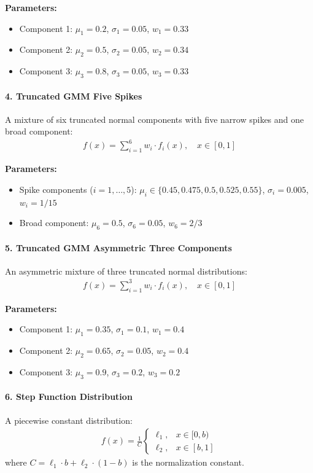 \textbf{Parameters:}
\begin{itemize}
\item Component 1: $\mu_1 = 0.2$, $\sigma_1 = 0.05$, $w_1 = 0.33$
\item Component 2: $\mu_2 = 0.5$, $\sigma_2 = 0.05$, $w_2 = 0.34$
\item Component 3: $\mu_3 = 0.8$, $\sigma_3 = 0.05$, $w_3 = 0.33$
\end{itemize}

\paragraph{4. Truncated GMM Five Spikes}
A mixture of six truncated normal components with five narrow spikes and one broad component:
\begin{align}
f(x) = \sum_{i=1}^6 w_i \cdot f_i(x), \quad x \in [0,1]
\end{align}

\textbf{Parameters:}
\begin{itemize}
\item Spike components ($i = 1,\ldots,5$): $\mu_i \in \{0.45, 0.475, 0.5, 0.525, 0.55\}$, $\sigma_i = 0.005$, $w_i = 1/15$
\item Broad component: $\mu_6 = 0.5$, $\sigma_6 = 0.05$, $w_6 = 2/3$
\end{itemize}

\paragraph{5. Truncated GMM Asymmetric Three Components}
An asymmetric mixture of three truncated normal distributions:
\begin{align}
f(x) = \sum_{i=1}^3 w_i \cdot f_i(x), \quad x \in [0,1]
\end{align}

\textbf{Parameters:}
\begin{itemize}
\item Component 1: $\mu_1 = 0.35$, $\sigma_1 = 0.1$, $w_1 = 0.4$
\item Component 2: $\mu_2 = 0.65$, $\sigma_2 = 0.05$, $w_2 = 0.4$
\item Component 3: $\mu_3 = 0.9$, $\sigma_3 = 0.2$, $w_3 = 0.2$
\end{itemize}

\paragraph{6. Step Function Distribution}
A piecewise constant distribution:
\begin{align}
f(x) = \frac{1}{C} \begin{cases}
\ell_1, & x \in [0, b) \\
\ell_2, & x \in [b, 1]
\end{cases}
\end{align}
where $C = \ell_1 \cdot b + \ell_2 \cdot (1-b)$ is the normalization constant.

